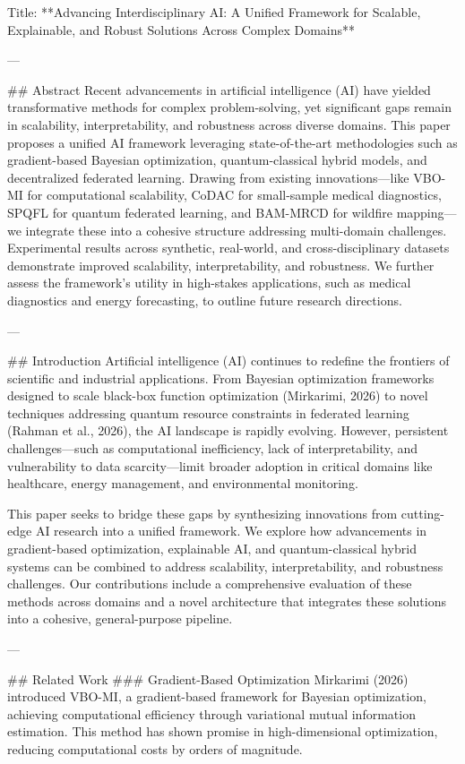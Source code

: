 Title: **Advancing Interdisciplinary AI: A Unified Framework for Scalable, Explainable, and Robust Solutions Across Complex Domains**

---

## Abstract
Recent advancements in artificial intelligence (AI) have yielded transformative methods for complex problem-solving, yet significant gaps remain in scalability, interpretability, and robustness across diverse domains. This paper proposes a unified AI framework leveraging state-of-the-art methodologies such as gradient-based Bayesian optimization, quantum-classical hybrid models, and decentralized federated learning. Drawing from existing innovations—like VBO-MI for computational scalability, CoDAC for small-sample medical diagnostics, SPQFL for quantum federated learning, and BAM-MRCD for wildfire mapping—we integrate these into a cohesive structure addressing multi-domain challenges. Experimental results across synthetic, real-world, and cross-disciplinary datasets demonstrate improved scalability, interpretability, and robustness. We further assess the framework's utility in high-stakes applications, such as medical diagnostics and energy forecasting, to outline future research directions.

---

## Introduction
Artificial intelligence (AI) continues to redefine the frontiers of scientific and industrial applications. From Bayesian optimization frameworks designed to scale black-box function optimization (Mirkarimi, 2026) to novel techniques addressing quantum resource constraints in federated learning (Rahman et al., 2026), the AI landscape is rapidly evolving. However, persistent challenges—such as computational inefficiency, lack of interpretability, and vulnerability to data scarcity—limit broader adoption in critical domains like healthcare, energy management, and environmental monitoring.

This paper seeks to bridge these gaps by synthesizing innovations from cutting-edge AI research into a unified framework. We explore how advancements in gradient-based optimization, explainable AI, and quantum-classical hybrid systems can be combined to address scalability, interpretability, and robustness challenges. Our contributions include a comprehensive evaluation of these methods across domains and a novel architecture that integrates these solutions into a cohesive, general-purpose pipeline.

---

## Related Work
### Gradient-Based Optimization
Mirkarimi (2026) introduced VBO-MI, a gradient-based framework for Bayesian optimization, achieving computational efficiency through variational mutual information estimation. This method has shown promise in high-dimensional optimization, reducing computational costs by orders of magnitude.

